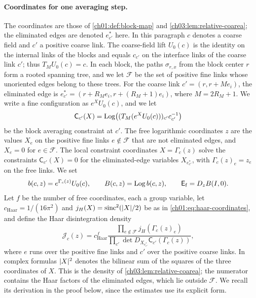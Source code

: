 \paragraph{Coordinates for one averaging step.}
The coordinates are those of \cref{ch01:def:block-map} and \cref{ch03:lem:relative-coarea}; the eliminated edges are denoted $e^*_{c'}$ here. In this paragraph $c$ denotes a coarse field and $c'$ a positive coarse link. The coarse-field lift $U_0(c)$ is the identity on the internal links of the blocks and equals $c_{c'}$ on the interface links of the coarse link $c'$; thus $T_MU_0(c)=c$. In each block, the paths $\sigma_{r,x}$ from the block center $r$ form a rooted spanning tree, and we let $\mathcal F$ be the set of positive fine links whose unoriented edges belong to these trees. For the coarse link $c'=(r,r+Me_i)$, the eliminated edge is $e^*_{c'}=(r+R_Me_i,r+(R_M+1)e_i)$, where $M=2R_M+1$. We write a fine configuration as $e^XU_0(c)$, and we let
\[
 \mathsf C_{c'}(X)=\operatorname{Log}\bigl((T_M(e^XU_0(c)))_{c'}c_{c'}^{-1}\bigr)
\]
be the block averaging constraint at $c'$. The free logarithmic coordinates $z$ are the values $X_e$ on the positive fine links $e\notin\mathcal F$ that are not eliminated edges, and $X_e=0$ for $e\in\mathcal F$. The local constraint coordinates $X=\Gamma_c(z)$ solve the constraints $\mathsf C_{c'}(X)=0$ for the eliminated-edge variables $X_{e^*_{c'}}$, with $\Gamma_c(z)_e=z_e$ on the free links. We set
\[
 b(c,z)=e^{\Gamma_c(z)}U_0(c),\qquad B(c,z)=\operatorname{Log} b(c,z),\qquad \mathsf E_{\mathrm f}=D_zB(I,0).
\]
Let $f$ be the number of free coordinates, each a group variable, let $c_{\mathrm{Haar}}=1/(16\pi^2)$ and $j_H(X)=\operatorname{sinc}^2(\lvert X\rvert/2)$ be as in \eqref{ch01:eq:haar-coordinates}, and define the Haar disintegration density
\[
 \mathcal J_c(z)=c_{\mathrm{Haar}}^f\frac{\prod_{e\notin\mathcal F}j_H(\Gamma_c(z)_e)}{\prod_{c'}\det D_{X_{e^*_{c'}}}\mathsf C_{c'}(\Gamma_c(z))},
\]
where $e$ runs over the positive fine links and $c'$ over the positive coarse links. In complex formulas $\lvert X\rvert^2$ denotes the bilinear sum of the squares of the three coordinates of $X$. This is the density of \cref{ch03:lem:relative-coarea}; the numerator contains the Haar factors of the eliminated edges, which lie outside $\mathcal F$. We recall its derivation in the proof below, since the estimates use its explicit form.

